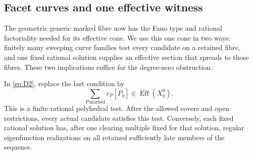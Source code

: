 \subsection{Facet curves and one effective witness}

The geometric generic marked fibre now has the Fano type and rational
factoriality needed for its effective cone. We use this one cone in two
ways: finitely many sweeping curve families test every candidate on a
retained fibre, and one fixed rational solution supplies an effective
section that spreads to those fibres. These two implications suffice for
the degree-zero obstruction.

\begin{lemma}\label{b:marked-cone-test}
In \eqref{eq:D2}, replace the last condition by
\[
 \sum_{P\ \mathrm{marked}}r_P[P_{\bar\eta}]
       \in\overline{\operatorname{Eff}}(X^0_{\bar\eta}).
\]
This is a finite rational polyhedral test. After the allowed covers and
open restrictions, every actual candidate satisfies this test. Conversely,
each fixed rational solution has, after one clearing multiple fixed
for that solution, regular eigenfunction realizations on all retained
sufficiently late members of the sequence.
\end{lemma}

